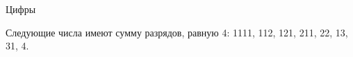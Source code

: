 \begin{tutorial}{Цифры}

Следующие числа имеют сумму разрядов, равную 4: 1111, 112, 121, 211, 22, 13, 31, 4.

\end{tutorial}
